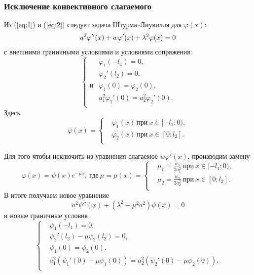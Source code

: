 \documentclass[12pt, a4paper]{article}
\begin{document}
\subsubsection{Исключение конвективного слагаемого}
Из (\ref{eq:1}) и (\ref{eq:2}) следует задача Штурма--Лиувилля для $\varphi(x)$:
\begin{equation}
  a^2 \varphi''(x) + w \varphi'(x) + \lambda^2\varphi(x)=0 \\
\end{equation}
с внешними граничными условиями и условиями сопряжения:
\begin{equation}
  \left\{
  \begin{aligned}
    & \varphi_1(-l_1) = 0, \\
    & \varphi_2'(l_2) = 0, \\
и   & \varphi_1(0) = \varphi_2(0), \\
    & a_1^2 \varphi_1'(0) = a_2^2 \varphi_2'(0). \\
  \end{aligned}
  \right.
  \label{eq:16}
\end{equation}
Здесь
\begin{equation}
  \varphi(x)=\left\{ 
    \begin{aligned}
      & \varphi_1(x)\ \text{при}\ x \in [-l_1;0), \\
      & \varphi_2(x)\ \text{при}\ x \in [0;l_2]. \\
    \end{aligned}
\right.
\end{equation}

Для того чтобы исключить из уравнения слагаемое $w\varphi'(x)$, производим замену 
\begin{equation}
  \varphi(x) = \psi(x) e^{- \mu x},\ \text{где}\ \mu=\mu(x) = \left\{
    \begin{aligned}
      & \mu_1 = \frac{w_1}{2a_1^2}\ \text{при}\ x \in [-l_1;0), \\
      & \mu_2 = \frac{w_2}{2a_2^2}\ \text{при}\ x \in [0;l_2]. \\
    \end{aligned}
    \right.
\end{equation}
В итоге получаем новое уравнение
\begin{equation}
  a^2\psi''(x) + (\lambda^2 - \mu^2a^2) \psi(x) = 0
  \label{eq:3}
\end{equation}
и новые граничные условия
\begin{equation}
  \left\{
  \begin{aligned}
    & \psi_1(-l_1) = 0, \\
    & \psi_2'(l_2) - \mu\psi_2(l_2) = 0, \\
    & \psi_1(0) = \psi_2(0), \\
    & a_1^2(\psi_1'(0) - \mu\psi_1(0)) =  a_2^2(\psi_2'(0) - \mu\psi_2(0)). \\
  \end{aligned}
  \right.
  \label{}
\end{equation}
\end{document}
